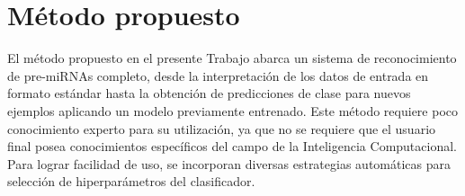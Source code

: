 
\chapter{Método propuesto}
El método propuesto en el presente Trabajo abarca un sistema de
reconocimiento de pre-miRNAs completo, desde la interpretación de los
datos de entrada en formato estándar hasta la obtención de
predicciones de clase para nuevos ejemplos aplicando un modelo
previamente entrenado.  Este método requiere poco conocimiento experto
para su utilización, ya que no se requiere que el usuario final posea
conocimientos específicos del campo de la Inteligencia
Computacional. Para lograr facilidad de uso, se incorporan diversas
estrategias automáticas para selección de hiperparámetros del
clasificador.
